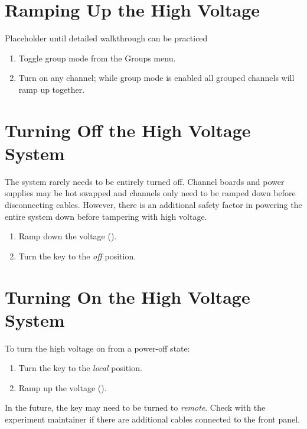 \section{Ramping Up the High Voltage}
\label{sec:op_high_voltage:rampup}

\FIXME{} Placeholder until detailed walkthrough can be practiced

\begin{enumerate}
\item Toggle group mode from the Groups menu.
\item Turn on any channel; while group mode is enabled all grouped channels will ramp up together.
\end{enumerate}


\section{Turning Off the High Voltage System}
\label{sec:op_high_voltage:turnoff}

The system rarely needs to be entirely turned off.  Channel boards and power supplies may be hot swapped and channels only need to be ramped down before disconnecting cables.  However, there is an additional safety factor in powering the entire system down before tampering with high voltage.

\begin{enumerate}
\item Ramp down the voltage ().
\item Turn the key to the \textit{off} position.
\end{enumerate}

\section{Turning On the High Voltage System}
\label{sec:op_high_voltage:turnoff}

To turn the high voltage on from a power-off state:
\begin{enumerate}
\item Turn the key to the \textit{local} position.
\item Ramp up the voltage ().
\end{enumerate}

\begin{note}
  In the future, the key may need to be turned to \emph{remote}.  Check with the experiment maintainer if there are additional cables connected to the front panel.
\end{note}



